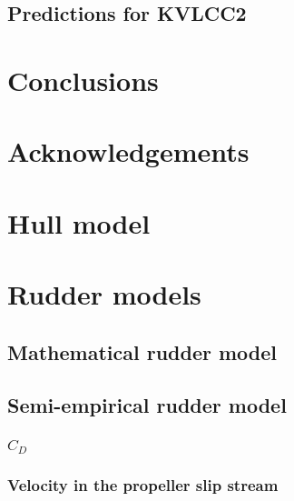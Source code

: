 \documentclass[preprint,12pt,authoryear]{elsarticle}
\begin{document}
\subsection{Predictions for KVLCC2}
\label{sec:result_KVLCC2_HMRI}

\FloatBarrier
%


%
\section{Conclusions}
\label{sec:conclusions}

\FloatBarrier

\section{Acknowledgements}


\appendix
\section{Hull model}
\label{sec:hull}

%
\section{Rudder models}
\label{sec:rudder_models}
\subsection{Mathematical rudder model}
\label{sec:mathematical_rudder_model}

\subsection{Semi-empirical rudder model}
\label{sec:semi-empirical_rudder_model}
%
\subsubsection{$C_D$}
\label{sec:CD}

\subsubsection{Velocity in the propeller slip stream}
\label{sec:velocity_in_the_propeller_slip_stream}

\end{document}
